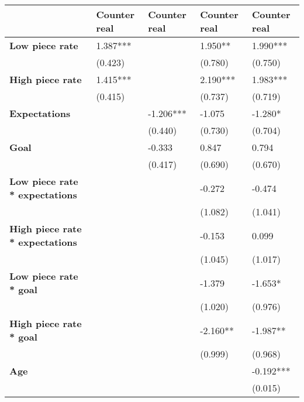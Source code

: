 \begin{tabular}{lllll}
\toprule
{} & Counter real & Counter real & Counter real & Counter real \\
\midrule
\textbf{Low piece rate                } &     1.387*** &              &      1.950** &     1.990*** \\
                               &      (0.423) &              &      (0.780) &      (0.750) \\
\textbf{High piece rate               } &     1.415*** &              &     2.190*** &     1.983*** \\
                               &      (0.415) &              &      (0.737) &      (0.719) \\
\textbf{Expectations                  } &              &    -1.206*** &       -1.075 &      -1.280* \\
                               &              &      (0.440) &      (0.730) &      (0.704) \\
\textbf{Goal                          } &              &       -0.333 &        0.847 &        0.794 \\
                               &              &      (0.417) &      (0.690) &      (0.670) \\
\textbf{Low piece rate * expectations } &              &              &       -0.272 &       -0.474 \\
                               &              &              &      (1.082) &      (1.041) \\
\textbf{High piece rate * expectations} &              &              &       -0.153 &        0.099 \\
                               &              &              &      (1.045) &      (1.017) \\
\textbf{Low piece rate * goal         } &              &              &       -1.379 &      -1.653* \\
                               &              &              &      (1.020) &      (0.976) \\
\textbf{High piece rate * goal        } &              &              &     -2.160** &     -1.987** \\
                               &              &              &      (0.999) &      (0.968) \\
\textbf{Age                           } &              &              &              &    -0.192*** \\
                               &              &              &              &      (0.015) \\

\end{tabular}
